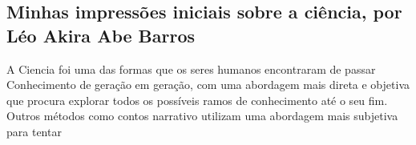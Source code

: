

\subsection{Minhas impressões iniciais sobre a ciência, por Léo Akira Abe Barros}

A \gls{Ciencia} foi uma das formas que os seres humanos encontraram de passar \gls{Conhecimento} de geração em geração, com uma abordagem mais direta e objetiva que procura explorar todos os possíveis ramos de conhecimento até o seu fim.
Outros métodos como contos narrativo utilizam uma abordagem mais subjetiva para tentar 